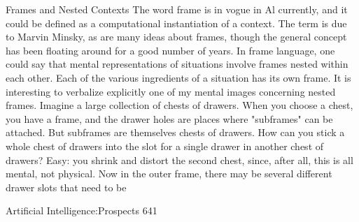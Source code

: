                             Frames and Nested Contexts
The word frame is in vogue in Al currently, and it could be defined as a computational
instantiation of a context. The term is due to Marvin Minsky, as are many ideas about
frames, though the general concept has been floating around for a good number of years.
In frame language, one could say that mental representations of situations involve frames
nested within each other. Each of the various ingredients of a situation has its own frame.
It is interesting to verbalize explicitly one of my mental images concerning nested
frames. Imagine a large collection of chests of drawers. When you choose a chest, you
have a frame, and the drawer holes are places where "subframes" can be attached. But
subframes are themselves chests of drawers. How can you stick a whole chest of drawers
into the slot for a single drawer in another chest of drawers? Easy: you shrink and distort
the second chest, since, after all, this is all mental, not physical. Now in the outer frame,
there may be several different drawer slots that need to be




Artificial Intelligence:Prospects                                                         641


